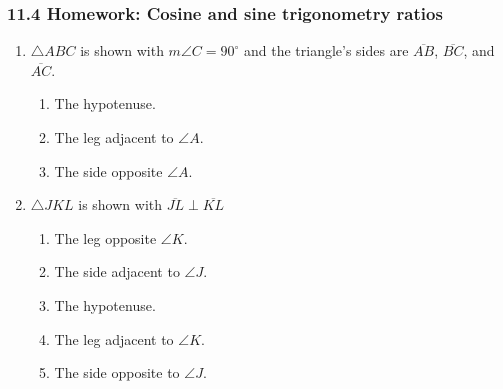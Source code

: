 \documentclass[12pt, twoside]{article}
\begin{document}
\subsubsection*{11.4 Homework: Cosine and sine trigonometry ratios}

\begin{enumerate}

\subsubsection*{Identify each given side of the triangle}
\item $\triangle ABC$ is shown with $m\angle C=90^\circ$ and the triangle's sides are $\overline{AB}$, $\overline{BC}$, and $\overline{AC}$.
  \begin{multicols}{2}
    \begin{enumerate}[itemsep=1cm]
      \item The hypotenuse.
      \item The leg adjacent to $\angle A$.
      \item The side opposite $\angle A$.
    \end{enumerate}
    \end{multicols} \vspace{0.5cm}

\item $\triangle JKL$ is shown with $\overline{JL} \perp \overline{KL}$
  \begin{multicols}{2}
    \begin{enumerate}[itemsep=0.8cm]
      \item The leg opposite $\angle K$.
      \item The side adjacent to $\angle J$.
      \item The hypotenuse.
      \item The leg adjacent to $\angle K$.
      \item The side opposite to $\angle J$.
    \end{enumerate}
    \end{multicols} \vspace{0.5cm}
  

\end{enumerate}
\end{document}
